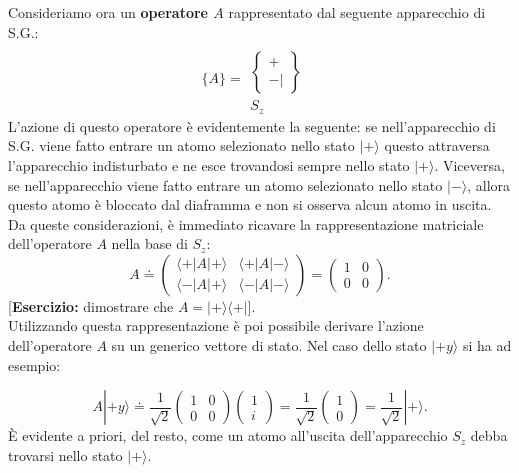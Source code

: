 Consideriamo ora un \textbf{operatore $A$} rappresentato dal seguente apparecchio di S.G.:
	\begin{equation}
		\bigg\lbrace A\bigg\rbrace =
		\begin{matrix}
		\
		\\[0.25cm]
		\begin{Bmatrix}
		 +  \\ - |  
		\end{Bmatrix} \\[0.5cm]
		S_z&
		\end{matrix}
	\end{equation}
L'azione di questo operatore è evidentemente la seguente:
se nell'apparecchio di S.G. viene fatto entrare un atomo selezionato nello stato $| + \rangle$ questo attraversa l'apparecchio indisturbato e ne esce trovandosi sempre nello stato $| + \rangle $. Viceversa, se nell'apparecchio viene fatto entrare un atomo selezionato nello stato $| - \rangle $, allora questo atomo è bloccato dal diaframma e non si osserva alcun atomo in uscita. Da queste considerazioni, è immediato ricavare la rappresentazione matriciale dell'operatore $A$ nella base di $S_z$:
	\begin{equation}
		\boxed{
			A \doteq 
			\begin{pmatrix}
			\langle + | A | + \rangle & \langle + | A | - \rangle \\
			\langle - | A | + \rangle & \langle - | A | - \rangle
			\end{pmatrix}=
			\begin{pmatrix}
			1 & 0\\
			0 & 0
			\end{pmatrix} .
			}
\end{equation}
[\textbf{Esercizio:}
dimostrare  che $A= | + \rangle \langle + | $].\\

Utilizzando questa rappresentazione è poi possibile derivare l'azione dell'operatore $A$ su un generico vettore di stato. Nel caso dello stato $| +y \rangle $ si ha ad esempio:

	\begin{equation}
		A | +y \rangle \doteq \frac{1}{\sqrt{2}}
		\begin{pmatrix}
		1 & 0\\
		0 & 0
		\end{pmatrix}
		\begin{pmatrix}
		1\\
		i
		\end{pmatrix}=
		\frac{1}{\sqrt{2}}\begin{pmatrix}
		1\\
		0
		\end{pmatrix}=
		\frac{1}{\sqrt{2}}| + \rangle .
	\end{equation}
È evidente a priori, del resto, come un atomo all'uscita dell'apparecchio $S_z$ debba trovarsi nello stato $| + \rangle $.


